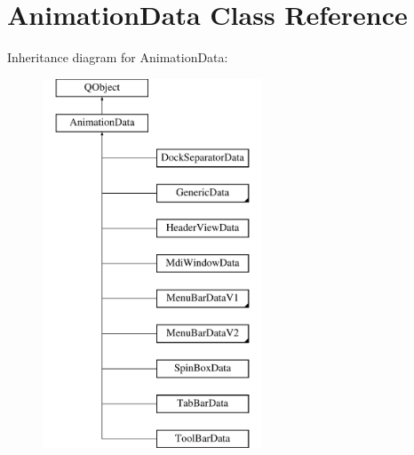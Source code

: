\hypertarget{class_animation_data}{}\section{Animation\+Data Class Reference}
\label{class_animation_data}
Inheritance diagram for Animation\+Data\+:\begin{figure}[H]
\begin{center}
\leavevmode
\includegraphics[height=11.000000cm]{class_animation_data}
\end{center}
\end{figure}
